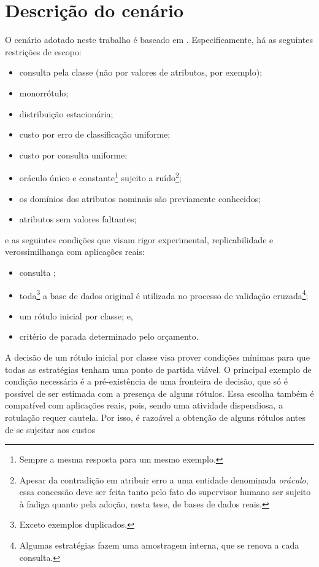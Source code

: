 \section{Descrição do cenário}
O cenário adotado neste trabalho é baseado em \pool.
Especificamente, há as seguintes restrições de escopo:
\begin{itemize}
 \item consulta pela classe (não por valores de atributos, por exemplo);
 \item monorrótulo;
 \item distribuição estacionária;
 \item custo por erro de classificação uniforme;
 \item custo por consulta uniforme;
 \item oráculo único e constante\footnote{Sempre a mesma resposta para um mesmo exemplo.}
 sujeito a ruído\footnote{Apesar da contradição em atribuir erro a uma entidade
 denominada \textit{oráculo}, essa concessão deve ser feita tanto pelo fato do supervisor
 humano ser sujeito à fadiga quanto pela adoção, nesta tese, de bases de dados reais.};
 \item os domínios dos atributos nominais são previamente conhecidos;
 \item atributos sem valores faltantes;
\end{itemize}
e as seguintes condições que visam rigor experimental, replicabilidade e
verossimilhança com aplicações reais:
\begin{itemize}
 \item consulta ;
 \item toda\footnote{Exceto exemplos duplicados.} a base de dados original é utilizada no
   processo de validação cruzada\footnote{Algumas estratégias fazem uma amostragem interna,
   que se renova a cada consulta.};
 \item um rótulo inicial por classe; e,
 \item critério de parada determinado pelo orçamento.
 \end{itemize}
A decisão de um rótulo inicial por classe visa prover condições mínimas
para que todas as estratégias tenham uma ponto de partida viável.
O principal exemplo de condição necessária é a pré-existência de uma fronteira de decisão,
que só é possível de ser estimada com a presença de alguns rótulos.
Essa escolha também é compatível com aplicações reais, pois,
sendo uma atividade dispendiosa, a rotulação requer cautela.
Por isso, é razoável a obtenção de alguns rótulos antes de se sujeitar aos custos
